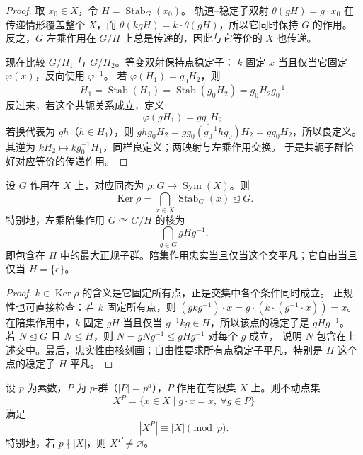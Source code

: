 \begin{proof}
取 $x_0\in X$，令 $H=\operatorname{Stab}_G(x_0)$。
轨道--稳定子双射 $\theta(gH)=g\cdot x_0$ 在传递情形覆盖整个 $X$，而
$\theta(kgH)=k\cdot\theta(gH)$，所以它同时保持 $G$ 的作用。
反之，$G$ 左乘作用在 $G/H$ 上总是传递的，因此与它等价的 $X$ 也传递。

现在比较 $G/H_1$ 与 $G/H_2$。等变双射保持点稳定子：
$k$ 固定 $x$ 当且仅当它固定 $\varphi(x)$，反向使用 $\varphi^{-1}$。
若 $\varphi(H_1)=g_0H_2$，则
\[
H_1=\operatorname{Stab}(H_1)=\operatorname{Stab}(g_0H_2)
=g_0H_2g_0^{-1}.
\]
反过来，若这个共轭关系成立，定义
\[
\varphi(gH_1)=gg_0H_2.
\]
若换代表为 $gh$（$h\in H_1$），则
$ghg_0H_2=gg_0(g_0^{-1}hg_0)H_2=gg_0H_2$，所以良定义。
其逆为 $kH_2\mapsto kg_0^{-1}H_1$，同样良定义；两映射与左乘作用交换。
于是共轭子群恰好对应等价的传递作用。
\end{proof}


\begin{proposition}[作用核与陪集作用]
设 $G$ 作用在 $X$ 上，对应同态为 $\rho:G\to\operatorname{Sym}(X)$。则
\[
\operatorname{Ker}\rho=\bigcap_{x\in X}\operatorname{Stab}_G(x)
\mathrel{\trianglelefteq}G.
\]
特别地，左乘陪集作用 $G\curvearrowright G/H$ 的核为
\[
\bigcap_{g\in G}gHg^{-1},
\]
即包含在 $H$ 中的最大正规子群。陪集作用忠实当且仅当这个交平凡；它自由当且仅当 $H=\{e\}$。
\label{prop:action-kernel-core}
\end{proposition}

\begin{proof}
$k\in\operatorname{Ker}\rho$ 的含义是它固定所有点，正是交集中各个条件同时成立。
正规性也可直接检查：若 $k$ 固定所有点，则
$(gkg^{-1})\cdot x=g\cdot(k\cdot(g^{-1}\cdot x))=x$。
在陪集作用中，$k$ 固定 $gH$ 当且仅当 $g^{-1}kg\in H$，所以该点的稳定子是 $gHg^{-1}$。
若 $N\mathrel{\trianglelefteq}G$ 且 $N\le H$，则 $N=gNg^{-1}\le gHg^{-1}$ 对每个 $g$ 成立，
说明 $N$ 包含在上述交中。最后，忠实性由核刻画；自由性要求所有点稳定子平凡，特别是 $H$ 这个点的稳定子 $H$ 平凡。
\end{proof}

\begin{theorem}[$p$-群作用的不动点定理]
\label{thm:pgroup-fixed-point}
设 $p$ 为素数，$P$ 为 $p$-群（$|P|=p^a$），$P$ 作用在有限集 $X$ 上。则不动点集
\[
X^P=\{x\in X\mid g\cdot x=x,\ \forall g\in P\}
\]
满足
\begin{equation}
|X^P|\equiv|X|\pmod{p}.
\label{eq:pgroup-fixed-point}
\end{equation}
特别地，若 $p\nmid|X|$，则 $X^P\neq\varnothing$。

\end{theorem}

